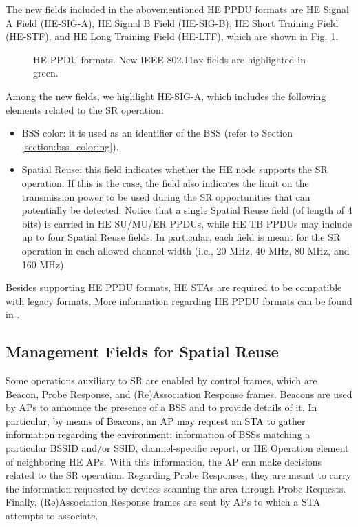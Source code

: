 \documentclass[preprint,12pt]{elsarticle}
\begin{document}
The new fields included in the abovementioned HE PPDU formats are HE Signal A Field (HE-SIG-A), HE Signal B Field (HE-SIG-B), HE Short Training Field (HE-STF), and HE Long Training Field (HE-LTF), which are shown in Fig. \ref{fig:appendix_1}.
\begin{figure}[ht!]
	\centering
	\caption{HE PPDU formats. New IEEE 802.11ax fields are highlighted in green.}
	\label{fig:appendix_1}
\end{figure}

Among the new fields, we highlight HE-SIG-A, which includes the following elements related to the SR operation:
\begin{itemize}
	\item BSS color: it is used as an identifier of the BSS (refer to Section \ref{section:bss_coloring}).
	\item Spatial Reuse: this field indicates whether the HE node supports the SR operation. If this is the case, the field also indicates the limit on the transmission power to be used during the SR opportunities that can potentially be detected. Notice that a single Spatial Reuse field (of length of 4 bits) is carried in HE SU/MU/ER PPDUs,  while HE TB PPDUs may include up to four Spatial Reuse fields. In particular, each field is meant for the SR operation in each allowed channel width (i.e., 20 MHz, 40 MHz, 80 MHz, and 160 MHz).
\end{itemize}

Besides supporting HE PPDU formats, HE STAs are required to be compatible with legacy formats. More information regarding HE PPDU formats can be found in \cite{rhode2017whitepaper}. 

\subsection{Management Fields for Spatial Reuse}
Some operations auxiliary to SR are enabled by control frames, which are Beacon, Probe Response, and (Re)Association Response frames. Beacons are used by APs to announce the presence of a BSS and to provide details of it. \textcolor{black}{In particular, by means of Beacons, an AP may request an STA to gather information regarding the environment:} information of BSSs matching a particular BSSID and/or SSID, channel-specific report, or HE Operation element of neighboring HE APs. With this information, the AP can make decisions related to the SR operation. Regarding Probe Responses, they are meant to carry the information requested by devices scanning the area through Probe Requests. Finally, (Re)Association Response frames are sent by APs to which a STA attempts to associate.
\end{document}
